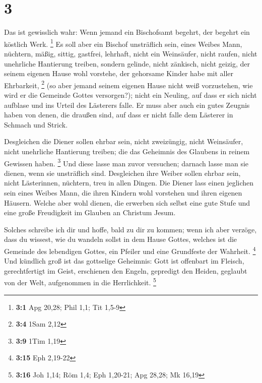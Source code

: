 \hypertarget{section-2}{%
\section{3}\label{section-2}}

 Das ist gewisslich wahr: Wenn jemand ein Bischofsamt
begehrt, der begehrt ein köstlich Werk. \footnote{\textbf{3:1} Apg
  20,28; Phil 1,1; Tit 1,5-9}  Es soll aber ein Bischof
unsträflich sein, eines Weibes Mann, nüchtern, mäßig, sittig, gastfrei,
lehrhaft,  nicht ein Weinsäufer, nicht raufen, nicht
unehrliche Hantierung treiben, sondern gelinde, nicht zänkisch, nicht
geizig,  der seinem eigenen Hause wohl vorstehe, der
gehorsame Kinder habe mit aller Ehrbarkeit, \footnote{\textbf{3:4} 1Sam
  2,12}  (so aber jemand seinem eigenen Hause nicht weiß
vorzustehen, wie wird er die Gemeinde Gottes versorgen?); 
nicht ein Neuling, auf dass er sich nicht aufblase und ins Urteil des
Lästerers falle.  Er muss aber auch ein gutes Zeugnis haben
von denen, die draußen sind, auf dass er nicht falle dem Lästerer in
Schmach und Strick.

 Desgleichen die Diener sollen ehrbar sein, nicht
zweizüngig, nicht Weinsäufer, nicht unehrliche Hantierung treiben;
 die das Geheimnis des Glaubens in reinem Gewissen haben.
\footnote{\textbf{3:9} 1Tim 1,19}  Und diese lasse man
zuvor versuchen; darnach lasse man sie dienen, wenn sie unsträflich
sind.  Desgleichen ihre Weiber sollen ehrbar sein, nicht
Lästerinnen, nüchtern, treu in allen Dingen.  Die Diener
lass einen jeglichen sein eines Weibes Mann, die ihren Kindern wohl
vorstehen und ihren eigenen Häusern.  Welche aber wohl
dienen, die erwerben sich selbst eine gute Stufe und eine große
Freudigkeit im Glauben an Christum Jesum.

 Solches schreibe ich dir und hoffe, bald zu dir zu kommen;
 wenn ich aber verzöge, dass du wissest, wie du wandeln
sollst in dem Hause Gottes, welches ist die Gemeinde des lebendigen
Gottes, ein Pfeiler und eine Grundfeste der Wahrheit. \footnote{\textbf{3:15}
  Eph 2,19-22}  Und kündlich groß ist das gottselige
Geheimnis: Gott ist offenbart im Fleisch, gerechtfertigt im Geist,
erschienen den Engeln, gepredigt den Heiden, geglaubt von der Welt,
aufgenommen in die Herrlichkeit. \footnote{\textbf{3:16} Joh 1,14; Röm
  1,4; Eph 1,20-21; Apg 28,28; Mk 16,19}

